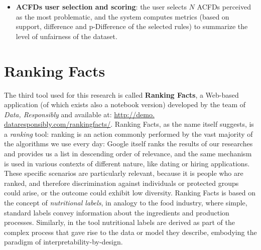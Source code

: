 \begin{itemize}
\item \textbf{ACFDs user selection and scoring}: the user selects \(N\) ACFDs perceived as the most problematic, and the system computes metrics (based on support, difference and p-Difference of the selected rules) to summarize the level of unfairness of the dataset.
\end{itemize}


\section{Ranking Facts}
The third tool used for this research is called \textbf{Ranking Facts}, a Web-based application (of which exists also a notebook version) developed by the team of \textit{Data, Responsibly} and available at: \url{http://demo. dataresponsibly.com/rankingfacts/}. Ranking Facts, as the name itself suggests, is a \textit{ranking} tool: ranking is an action commonly performed by the vast majority of the algorithms we use every day: Google itself ranks the results of our researches and provides us a list in descending order of relevance, and the same mechanism is used in various contexts of different nature, like dating or hiring applications. These specific scenarios are particularly relevant, because it is people who are ranked, and therefore discrimination against individuals or protected groups could arise, or the outcome could exhibit low diversity. Ranking Facts is based on the concept of \textit{nutritional labels}, in analogy to the food industry, where simple, standard labels convey information about the ingredients and production processes. Similarly, in the tool nutritional labels are derived as part of the complex process that gave rise to the data or model they describe, embodying the paradigm of interpretability-by-design.

